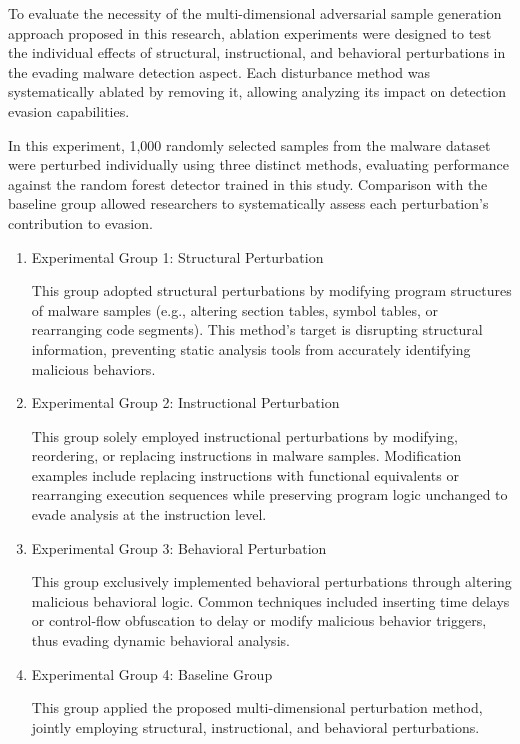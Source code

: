 To evaluate the necessity of the multi-dimensional adversarial sample generation approach proposed in this research, ablation experiments were designed to test the individual effects of structural, instructional, and behavioral perturbations in the evading malware detection aspect. Each disturbance method was systematically ablated by removing it, allowing analyzing its impact on detection evasion capabilities.

In this experiment, 1,000 randomly selected samples from the malware dataset were perturbed individually using three distinct methods, evaluating performance against the random forest detector trained in this study. Comparison with the baseline group allowed researchers to systematically assess each perturbation's contribution to evasion.

\begin{enumerate}

\item Experimental Group 1: Structural Perturbation

This group adopted structural perturbations by modifying program structures of malware samples (e.g., altering section tables, symbol tables, or rearranging code segments). This method's target is disrupting structural information, preventing static analysis tools from accurately identifying malicious behaviors.

\item Experimental Group 2: Instructional Perturbation

This group solely employed instructional perturbations by modifying, reordering, or replacing instructions in malware samples. Modification examples include replacing instructions with functional equivalents or rearranging execution sequences while preserving program logic unchanged to evade analysis at the instruction level.

\item Experimental Group 3: Behavioral Perturbation

This group exclusively implemented behavioral perturbations through altering malicious behavioral logic. Common techniques included inserting time delays or control-flow obfuscation to delay or modify malicious behavior triggers, thus evading dynamic behavioral analysis.

\item Experimental Group 4: Baseline Group

This group applied the proposed multi-dimensional perturbation method, jointly employing structural, instructional, and behavioral perturbations.
\end{enumerate}


